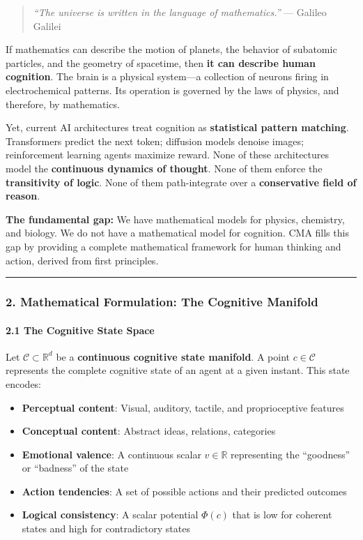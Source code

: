 \documentclass[
  11pt,
  a4paper,
]{article}
\providecommand{\tightlist}{%
  \setlength{\itemsep}{0pt}\setlength{\parskip}{0pt}}
\begin{document}
\begin{quote}
\emph{``The universe is written in the language of mathematics.''} ---
Galileo Galilei
\end{quote}

If mathematics can describe the motion of planets, the behavior of
subatomic particles, and the geometry of spacetime, then \textbf{it can
describe human cognition}. The brain is a physical system---a collection
of neurons firing in electrochemical patterns. Its operation is governed
by the laws of physics, and therefore, by mathematics.

Yet, current AI architectures treat cognition as \textbf{statistical
pattern matching}. Transformers predict the next token; diffusion models
denoise images; reinforcement learning agents maximize reward. None of
these architectures model the \textbf{continuous dynamics of thought}.
None of them enforce the \textbf{transitivity of logic}. None of them
path-integrate over a \textbf{conservative field of reason}.

\textbf{The fundamental gap:} We have mathematical models for physics,
chemistry, and biology. We do not have a mathematical model for
cognition. CMA fills this gap by providing a complete mathematical
framework for human thinking and action, derived from first principles.

\begin{center}\rule{0.5\linewidth}{0.5pt}\end{center}

\subsubsection{2. Mathematical Formulation: The Cognitive
Manifold}\label{mathematical-formulation-the-cognitive-manifold}

\paragraph{2.1 The Cognitive State
Space}\label{the-cognitive-state-space}

Let \(\mathcal{C} \subset \mathbb{R}^d\) be a \textbf{continuous
cognitive state manifold}. A point \(c \in \mathcal{C}\) represents the
complete cognitive state of an agent at a given instant. This state
encodes:

\begin{itemize}
\tightlist
\item
  \textbf{Perceptual content}: Visual, auditory, tactile, and
  proprioceptive features
\item
  \textbf{Conceptual content}: Abstract ideas, relations, categories
\item
  \textbf{Emotional valence}: A continuous scalar \(v \in \mathbb{R}\)
  representing the ``goodness'' or ``badness'' of the state
\item
  \textbf{Action tendencies}: A set of possible actions and their
  predicted outcomes
\item
  \textbf{Logical consistency}: A scalar potential \(\Phi(c)\) that is
  low for coherent states and high for contradictory states
\end{itemize}
\end{document}
